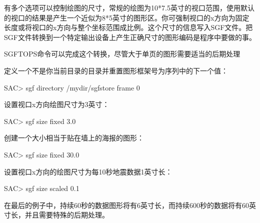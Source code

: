 有多个选项可以控制绘图的尺寸，常规的绘图为10*7.5英寸的视口范围，使用默认的视口的结果是产生一个近似为8*5英寸的图形区。你可强制视口的x方向为固定长度或将视口的x方向与整个坐标范围成比例。这个尺寸的信息写入SGF文件。把SGF文件转换到一个特定输出设备上产生正确尺寸的图形编码是程序中要做的事。

SGFTOPS命令可以完成这个转换，尽管大于单页的图形需要适当的后期处理

定义一个不是你当前目录的目录并重置图形框架号为序列中的下一个值：
\begin{SACCode}
SAC> sgf directory /mydir/sgfstore frame 0
\end{SACCode}

设置视口x方向绘图尺寸为3英寸：
\begin{SACCode}
SAC> sgf size fixed 3.0
\end{SACCode}

创建一个大小相当于贴在墙上的海报的图形：
\begin{SACCode}
SAC> sgf size fixed 30.0
\end{SACCode}

设置视口x方向的绘图尺寸为每10秒地震数据1英寸长：
\begin{SACCode}
SAC> sgf size scaled 0.1
\end{SACCode}
在最后的例子中，持续60秒的数据图形将有6英寸长，而持续600秒的数据将有60英寸长，并且需要特殊的后期处理。
